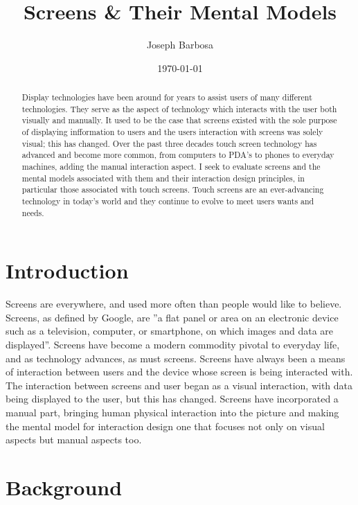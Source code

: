 \documentclass[a4paper]{article}
\title{Screens \& Their Mental Models}
\author{Joseph Barbosa}
\date{\today}
\begin{document}
\maketitle

\begin{abstract}

     Display technologies have been around for years to assist users of many different technologies. They serve as the aspect of technology which interacts with the user both visually and manually. It used to be the case that screens existed with the sole purpose of displaying infformation to users and the users interaction with screens was solely visual; this has changed. Over the past three decades touch screen technology has advanced and become more common, from computers to PDA's to phones to everyday machines, adding the manual interaction aspect. I seek to evaluate screens and the mental models associated with them and their interaction design principles, in particular those associated with touch screens. Touch screens are an ever-advancing technology in today's world and they continue to evolve to meet users wants and needs.

\end{abstract}

\section{Introduction}

     Screens are everywhere, and used more often than people would like to believe. Screens, as defined by Google, are ''a flat panel or area on an electronic device such as a television, computer, or smartphone, on which images and data are displayed''. Screens have become a modern commodity pivotal to everyday life, and as technology advances, as must screens. Screens have always been a means of interaction between users and the device whose screen is being interacted with. The interaction between screens and user began as a visual interaction, with data being displayed to the user, but this has changed. Screens have incorporated a manual part, bringing human  physical interaction into the picture and making the mental model for interaction design one that focuses not only on visual aspects but manual aspects too. 

\section{Background}
\end{document}

